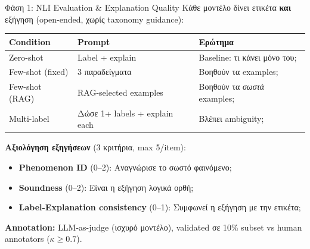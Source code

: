 \documentclass[aspectratio=169,10pt]{beamer}
\begin{document}
\begin{frame}{Φάση 1: NLI Evaluation \& Explanation Quality}
	Κάθε μοντέλο δίνει ετικέτα \textbf{και} εξήγηση (open-ended, χωρίς taxonomy guidance):

	\vspace{0.3cm}
	\begin{center}
		\footnotesize
		\begin{tabular}{l l l}
			\toprule
			\textbf{Condition} & \textbf{Prompt} & \textbf{Ερώτημα} \\
			\midrule
			Zero-shot & Label + explain & Baseline: τι κάνει μόνο του; \\
			Few-shot (fixed) & 3 παραδείγματα & Βοηθούν τα examples; \\
			Few-shot (RAG) & RAG-selected examples & Βοηθούν τα \textit{σωστά} examples; \\
			Multi-label & Δώσε 1+ labels + explain each & Βλέπει ambiguity; \\
			\bottomrule
		\end{tabular}
	\end{center}

	\vspace{0.3cm}
	\textbf{Αξιολόγηση εξηγήσεων} (3 κριτήρια, max 5/item):
	\begin{itemize}
		\item \textbf{Phenomenon ID} (0--2): Αναγνώρισε το σωστό φαινόμενο;
		\item \textbf{Soundness} (0--2): Είναι η εξήγηση λογικά ορθή;
		\item \textbf{Label-Explanation consistency} (0--1): Συμφωνεί η εξήγηση με την ετικέτα;
	\end{itemize}

	\vspace{0.2cm}
	\textbf{Annotation:} LLM-as-judge (ισχυρό μοντέλο), validated σε 10\% subset vs human annotators ($\kappa \geq 0.7$).
\end{frame}
\end{document}
